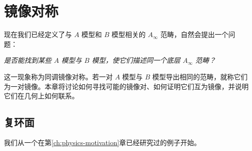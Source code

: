 \chapter{镜像对称}
现在我们已经定义了与 $A$ 模型和 $B$ 模型相关的 $A_\infty$ 范畴，自然会提出一个问题：
\begin{center}
  \emph{是否能找到某些 $A$ 模型与 $B$ 模型，使它们描述同一个底层 $A_\infty$ 范畴？}
\end{center}
这一现象称为同调镜像对称。若一对 $A$ 模型与 $B$ 模型导出相同的范畴，就称它们为一对镜像。本章将讨论如何寻找可能的镜像对、如何证明它们互为镜像，并说明它们在几何上如何联系。

\section{复环面}\label{sec:complex-torus}
我们从一个在第\ref{ch:physics-motivation}章已经研究过的例子开始。

